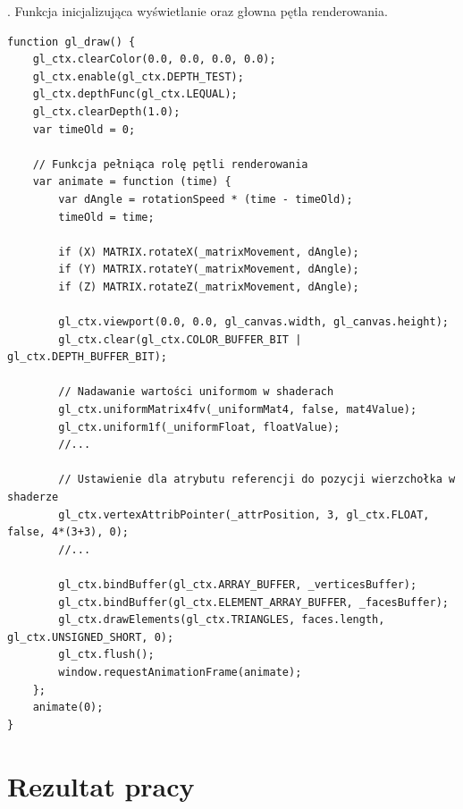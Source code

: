 \documentclass[a4paper,11pt]{article}
\begin{document}
. Funkcja inicjalizująca wyświetlanie oraz głowna pętla renderowania.
\begin{verbatim}
function gl_draw() {    
	gl_ctx.clearColor(0.0, 0.0, 0.0, 0.0);    
	gl_ctx.enable(gl_ctx.DEPTH_TEST);    
	gl_ctx.depthFunc(gl_ctx.LEQUAL);    
	gl_ctx.clearDepth(1.0);   
	var timeOld = 0;     

	// Funkcja pełniąca rolę pętli renderowania
	var animate = function (time) {       
		var dAngle = rotationSpeed * (time - timeOld);  
		timeOld = time;        

		if (X) MATRIX.rotateX(_matrixMovement, dAngle);
		if (Y) MATRIX.rotateY(_matrixMovement, dAngle);
		if (Z) MATRIX.rotateZ(_matrixMovement, dAngle);

		gl_ctx.viewport(0.0, 0.0, gl_canvas.width, gl_canvas.height);
		gl_ctx.clear(gl_ctx.COLOR_BUFFER_BIT | gl_ctx.DEPTH_BUFFER_BIT);        

		// Nadawanie wartości uniformom w shaderach
		gl_ctx.uniformMatrix4fv(_uniformMat4, false, mat4Value);    
		gl_ctx.uniform1f(_uniformFloat, floatValue);
		//...

		// Ustawienie dla atrybutu referencji do pozycji wierzchołka w shaderze
		gl_ctx.vertexAttribPointer(_attrPosition, 3, gl_ctx.FLOAT, false, 4*(3+3), 0);  
		//...

		gl_ctx.bindBuffer(gl_ctx.ARRAY_BUFFER, _verticesBuffer);       
		gl_ctx.bindBuffer(gl_ctx.ELEMENT_ARRAY_BUFFER, _facesBuffer);     
		gl_ctx.drawElements(gl_ctx.TRIANGLES, faces.length, gl_ctx.UNSIGNED_SHORT, 0); 
		gl_ctx.flush();        
		window.requestAnimationFrame(animate);    
	};    
	animate(0); 
}
\end{verbatim}
\newpage


\section{Rezultat pracy}
\end{document}
